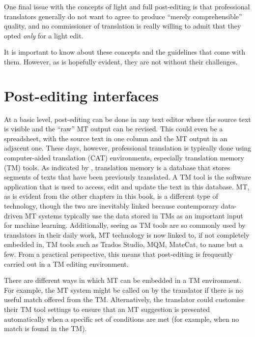\documentclass[output=paper,colorlinks,citecolor=brown]{langscibook}
\begin{document}
One final issue with the concepts of light and full post-editing is that professional translators generally do not want to agree to produce “merely comprehensible” quality, and no commissioner of translation is really willing to admit that they opted \textit{only} for a light edit.

It is important to know about these concepts and the guidelines that come with them. However, as is hopefully evident, they are not without their challenges.

\section{Post-editing interfaces}\label{sec:obrien:3}

At a basic level, post-editing can be done in any text editor where the source text is visible and the “raw” MT output can be revised. This could even be a spreadsheet, with the source text in one column and the MT output in an adjacent one. These days, however, professional translation is typically done using computer-aided translation (CAT) environments, especially translation memory (TM) tools. As indicated by , translation memory is a database that stores segments of texts that have been previously translated. A TM tool is the software application that is used to access, edit and update the text in this database. MT, as is evident from the other chapters in this book, is a different type of technology, though the two are inevitably linked because contemporary data-driven MT systems typically use the data stored in TMs as an important input for machine learning. Additionally, seeing as TM tools are so commonly used by translators in their daily work, MT technology is now linked to, if not completely embedded in, TM tools such as Trados Studio, MQM, MateCat, to name but a few. From a practical perspective, this means that post-editing is frequently carried out in a TM editing environment.

There are different ways in which MT can be embedded in a TM environment. For example, the MT system might be called on by the translator if there is no useful match offered from the TM. Alternatively, the translator could customise their TM tool settings to ensure that an MT suggestion is presented automatically when a specific set of conditions are met (for example, when no match is found in the TM). 
\end{document}
